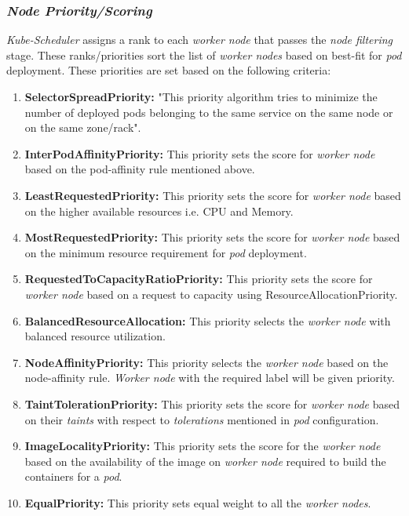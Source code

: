 \subsubsection{\emph{Node Priority/Scoring}}
\label{sec:node-priority}
\emph{Kube-Scheduler} assigns a rank to each \emph{worker node} that passes the \emph{node filtering} stage. These ranks/priorities sort the list of \emph{worker nodes} based on best-fit for \emph{pod} deployment\cite{Santos2019}. These priorities are set based on the following criteria\cite{k8s}:
\begin{enumerate}
  \item \textbf{SelectorSpreadPriority:} "This priority algorithm tries to minimize the number of deployed pods belonging to the same service on the same node or on the same zone/rack"\cite{Santos2019}.
  \item \textbf{InterPodAffinityPriority:} This priority sets the score for \emph{worker node} based on the pod-affinity rule mentioned above.
  \item \textbf{LeastRequestedPriority:} This priority sets the score for \emph{worker node} based on the higher available resources i.e. CPU and Memory.
  \item \textbf{MostRequestedPriority:} This priority sets the score for \emph{worker node} based on the minimum resource requirement for \emph{pod} deployment.
  \item \textbf{RequestedToCapacityRatioPriority:} This priority sets the score for \emph{worker node} based on a request to capacity using ResourceAllocationPriority.
  \item \textbf{BalancedResourceAllocation:} This priority selects the \emph{worker node} with balanced resource utilization.
  \item \textbf{NodeAffinityPriority:} This priority selects the \emph{worker node} based on the node-affinity rule. \emph{Worker node} with the required label will be given priority.
  \item \textbf{TaintTolerationPriority:} This priority sets the score for \emph{worker node} based on their \emph{taints} with respect to \emph{tolerations} mentioned in \emph{pod} configuration\cite{Santos2019}.
  \item \textbf{ImageLocalityPriority:} This priority sets the score for the \emph{worker node} based on the availability of the image on \emph{worker node} required to build the containers for a \emph{pod}.
  \item \textbf{EqualPriority:} This priority sets equal weight to all the \emph{worker nodes}.
\end{enumerate}
